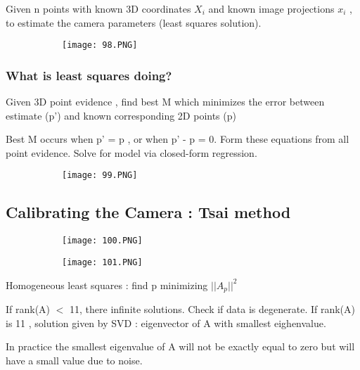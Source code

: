 \documentclass{article}
\begin{document}
Given n points with known 3D coordinates $X_i$ and known image projections $x_i$ , to estimate the camera parameters (least squares solution).

\begin{figure}[ht!]
  \centering
  \begin{subfigure}[b]{0.4\linewidth}
    \texttt{[image: 98.PNG]}
  \end{subfigure}
\end{figure}

\subsubsection{What is least squares doing?}

Given 3D point evidence , find best M which minimizes the error between estimate (p') and known corresponding 2D points (p)

Best M occurs when p' = p , or when p' - p = 0. Form these equations from all point evidence. Solve for model via closed-form regression.

\begin{figure}[ht!]
  \centering
  \begin{subfigure}[b]{0.4\linewidth}
    \texttt{[image: 99.PNG]}
  \end{subfigure}
\end{figure}

\subsection{Calibrating the Camera : Tsai method}

\begin{figure}[ht!]
  \centering
  \begin{subfigure}[b]{0.4\linewidth}
    \texttt{[image: 100.PNG]}
  \end{subfigure}
  \begin{subfigure}[b]{0.4\textwidth}
         \centering
         \texttt{[image: 101.PNG]}
     \end{subfigure}
\end{figure}

Homogeneous least squares : find p minimizing $||A_p||^2$

If rank(A) $<$ 11, there infinite solutions. Check if data is degenerate.
If rank(A) is 11 , solution given by SVD : eigenvector of A with smallest eighenvalue.

In practice the smallest eigenvalue of A will not be exactly equal to zero but will have a small value due to noise.
\end{document}

